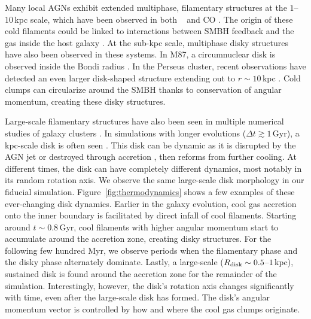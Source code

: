 Many local AGNs exhibit extended multiphase, filamentary structures at the $1$--$10$\,kpc scale, which have been observed in both \halpha\ \citep[][]{conselice_nature_2001,olivares_ubiquitous_2019} and CO \citep[][]{edge_detection_2001,mcnamara_1010_2014}.
The origin of these cold filaments could be linked to interactions between SMBH feedback and the gas inside the host galaxy \citep[][]{cavagnolo_entropy_2008,tremblay_cold_2016}.
At the sub-kpc scale, multiphase disky structures have also been observed in these systems.
In M87, a circumnuclear disk is observed inside the Bondi radius \citep[][]{walsh_m87_2013,osorno_revisiting_2023}.
In the Perseus cluster, recent observations have detected an even larger disk-shaped structure extending out to $r\sim 10$\,kpc \citep[][]{vigneron_high-spectral-resolution_2024}.
Cold clumps can circularize around the SMBH thanks to conservation of angular momentum, creating these disky structures.

Large-scale filamentary structures have also been seen in multiple numerical studies of galaxy clusters \citep[e.g.,][]{li_2014b,eisenreich_active_2017,beckmann_dense_2019}.
In simulations with longer evolutions ($\Delta t\gtrsim1\,$Gyr), a kpc-scale disk is often seen \citep[e.g.,][]{li_2014a,prasad_cool_2015,wang_agn_2019}.
This disk can be dynamic as it is disrupted by the AGN jet or destroyed through accretion \citep[][]{prasad_cool_2015}, then reforms from further cooling.
At different times, the disk can have completely different dynamics, most notably in its random rotation axis.
We observe the same large-scale disk morphology in our fiducial simulation.
Figure~\ref{fig:thermodynamics} shows a few examples of these ever-changing disk dynamics.
Earlier in the galaxy evolution, cool gas accretion onto the inner boundary is facilitated by direct infall of cool filaments.
Starting around $t \sim 0.8$\,Gyr, cool filaments with higher angular momentum start to accumulate around the accretion zone, creating disky structures.
For the following few hundred Myr, we observe periods when the filamentary phase and the disky phase alternately dominate.
Lastly, a large-scale ($R_{\rm disk} \sim 0.5$--$1$\,kpc), sustained disk is found around the accretion zone for the remainder of the simulation.
Interestingly, however, the disk's rotation axis changes significantly with time, even after the large-scale disk has formed.
The disk's angular momentum vector is controlled by how and where the cool gas clumps originate.



